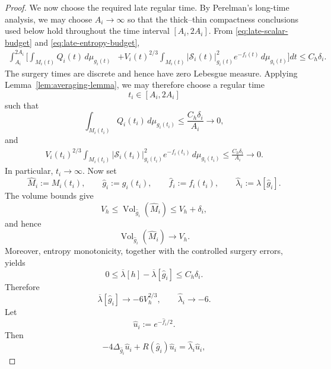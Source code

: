 \documentclass{amsart}
\begin{document}
\begin{proof}
\medskip
\noindent
We now choose the required late regular time. By Perelman's long-time
analysis, we may choose \(A_i\to\infty\) so that the thick--thin
compactness conclusions used below hold throughout the time interval
\([A_i,2A_i]\). From \eqref{eq:late-scalar-budget} and
\eqref{eq:late-entropy-budget},
\[
\begin{aligned}
        \int_{A_i}^{2A_i}
        \bigg[
        \int_{M_i(t)}Q_i(t)\,d\mu_{g_i(t)}
        &+
        V_i(t)^{2/3}
        \int_{M_i(t)}
        |\mathcal S_i(t)|_{g_i(t)}^2
        e^{-f_i(t)}\,d\mu_{g_i(t)}
        \bigg]dt
        \leq C_h\delta_i.
\end{aligned}
\]
The surgery times are discrete and hence have zero Lebesgue measure.
Applying Lemma~\ref{lem:averaging-lemma}, we may therefore choose a
regular time
\[
        t_i\in[A_i,2A_i]
\]
such that
\begin{equation}
\label{eq:late-good-scalar}
        \int_{M_i(t_i)}
        Q_i(t_i)\,d\mu_{g_i(t_i)}
        \leq
        \frac{C_h\delta_i}{A_i}
        \longrightarrow0,
\end{equation}
and
\begin{equation}
\label{eq:late-good-entropy}
\begin{aligned}
        V_i(t_i)^{2/3}
        \int_{M_i(t_i)}
        |\mathcal S_i(t_i)|_{g_i(t_i)}^2
        e^{-f_i(t_i)}\,d\mu_{g_i(t_i)}
        \leq
        \frac{C_h\delta_i}{A_i}
        \longrightarrow0.
\end{aligned}
\end{equation}
In particular, \(t_i\to\infty\). Now set
\[
        \widehat M_i:=M_i(t_i),
        \qquad
        \widehat g_i:=g_i(t_i),
        \qquad
        \widehat f_i:=f_i(t_i),
        \qquad
        \widehat\lambda_i:=\lambda[\widehat g_i].
\]
The volume bounds give
\[
        V_h
        \leq
        \operatorname{Vol}_{\widehat g_i}(\widehat M_i)
        \leq
        V_h+\delta_i,
\]
and hence
\[
        \operatorname{Vol}_{\widehat g_i}(\widehat M_i)
        \longrightarrow V_h.
\]
Moreover, entropy monotonicity, together with the controlled surgery
errors, yields
\[
        0\leq
        \overline\lambda[h]-\overline\lambda[\widehat g_i]
        \leq C_h\delta_i.
\]
Therefore
\[
        \overline\lambda[\widehat g_i]
        \longrightarrow
        -6V_h^{2/3},
        \qquad
        \widehat\lambda_i\longrightarrow-6.
\]
Let
\[
        \widehat u_i:=e^{-\widehat f_i/2}.
\]
Then
\[
        -4\Delta_{\widehat g_i}\widehat u_i
        +
        R(\widehat g_i)\widehat u_i
        =
        \widehat\lambda_i\widehat u_i,
\]
\end{proof}
\end{document}
